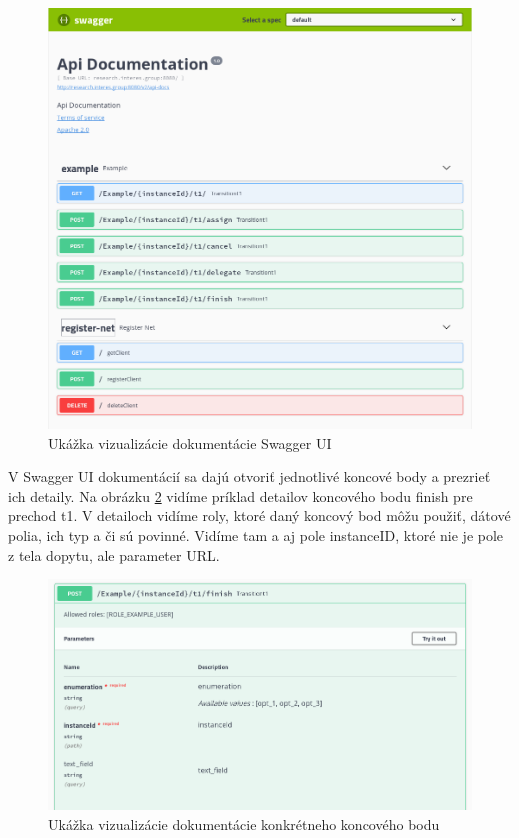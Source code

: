 \begin{figure}[!htbp]
	\centering
	\includegraphics[width=16cm]{img/swagger_ui.png}
	\caption{Ukážka vizualizácie dokumentácie Swagger UI}
	\label{swagger_ui}
\end{figure}

V Swagger UI dokumentácií sa dajú otvoriť jednotlivé koncové body a prezrieť ich detaily. Na obrázku \ref{swagger_ui_endpoint} vidíme príklad detailov koncového bodu finish pre prechod t1. V detailoch vidíme roly, ktoré daný koncový bod môžu použiť, dátové polia, ich typ a či sú povinné. Vidíme tam a aj pole instanceID, ktoré nie je pole z tela dopytu, ale parameter URL.

\begin{figure}[!htbp]
	\centering
	\includegraphics[width=16cm]{img/swagger_ui_endpoint.png}
	\caption{Ukážka vizualizácie dokumentácie konkrétneho koncového bodu}
	\label{swagger_ui_endpoint}
\end{figure}



